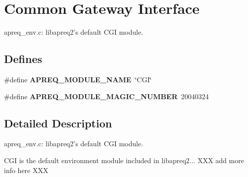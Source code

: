 \section{Common Gateway Interface}
\label{group__CGI}
apreq\_\-env.c: libapreq2's default CGI module. 
\subsection*{Defines}
\begin{CompactItemize}
\item 
{}
\#define {\bf APREQ\_\-MODULE\_\-NAME}\ \char`\"{}CGI\char`\"{}\label{group__CGI_a13}

\item 
{}
\#define {\bf APREQ\_\-MODULE\_\-MAGIC\_\-NUMBER}\ 20040324\label{group__CGI_a14}

\end{CompactItemize}


\subsection{Detailed Description}
apreq\_\-env.c: libapreq2's default CGI module.

CGI is the default environment module included in libapreq2... XXX add more info here XXX 
